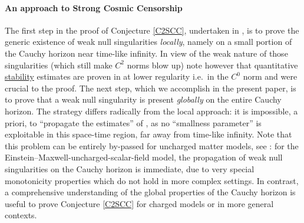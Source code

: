 \documentclass[10pt,a4paper]{article}
\theoremstyle{plain}
\theoremstyle{remark}
\theoremstyle{definition}
\theoremstyle{plain}
\theoremstyle{remark}
\theoremstyle{definition}
\numberwithin{equation}{section}
\begin{document}
 	\paragraph{An approach to Strong Cosmic Censorship}	The first step in the proof of Conjecture \ref{C2SCC}, undertaken in \cite{Moi}, is to prove the generic existence of weak null singularities \textit{locally}, namely on a small portion of the Cauchy horizon near time-like infinity. In view of the weak nature of those singularities (which still make $C^2$ norms blow up) note however that quantitative \underline{stability} estimates are proven in \cite{Moi} at lower regularity i.e.\ in the $C^0$ norm and were crucial to the proof. The next step, which we accomplish in the present paper, is to prove that a weak null singularity is present \textit{globally} on the entire Cauchy horizon. The strategy differs radically from the local approach: it is impossible, a priori, to ``propagate the estimates'' of \cite{Moi}, as no ``smallness parameter'' is exploitable in this space-time region, far away from time-like infinity. Note that this problem can be entirely by-passed for uncharged matter models, see \cite{JonathanStab}:  for the Einstein--Maxwell-uncharged-scalar-field model, the propagation of weak null singularities on the Cauchy horizon is immediate, due to very special monotonicity properties which do not hold in more complex settings. In contrast, a comprehensive understanding of the global properties of the Cauchy horizon is useful to prove Conjecture \ref{C2SCC} for charged models or in more general contexts.%
 	
\end{document}
